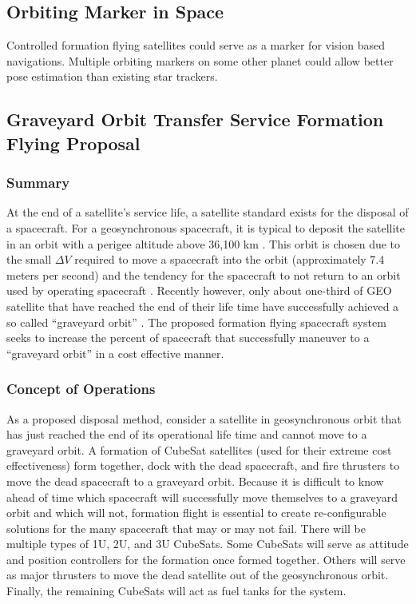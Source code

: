 \subsection{Orbiting Marker in Space}
\label{marker}
Controlled formation flying satellites could serve as a marker for vision based navigations. Multiple orbiting markers on some other planet could allow better pose estimation than existing star trackers.

\subsection{Graveyard Orbit Transfer Service Formation Flying Proposal}
\label{grave}
\subsubsection{Summary}
At the end of a satellite's service life, a satellite standard exists for the disposal of a spacecraft. For a geosynchronous spacecraft, it is typical to deposit the satellite in an orbit with a perigee altitude above 36,100 km \cite{standard}. This orbit is chosen due to the small $\Delta V$ required to move a spacecraft into the orbit (approximately 7.4 meters per second) and the tendency for the spacecraft to not return to an orbit used by operating spacecraft \cite {SMAD}. Recently however, only about one-third of GEO satellite that have reached the end of their life time have successfully achieved a so called ``graveyard orbit'' \cite{ESA}. The proposed formation flying spacecraft system seeks to increase the percent of spacecraft that successfully maneuver to a ``graveyard orbit'' in a cost effective manner. 

\subsubsection{Concept of Operations}
As a proposed disposal method, consider a satellite in geosynchronous orbit that has just reached the end of its operational life time and cannot move to a graveyard orbit. A formation of CubeSat satellites (used for their extreme cost effectiveness) form together, dock with the dead spacecraft, and fire thrusters to move the dead spacecraft to a graveyard orbit. Because it is difficult to know ahead of time which spacecraft will successfully move themselves to a graveyard orbit and which will not, formation flight is essential to create re-configurable solutions for the many spacecraft that may or may not fail. There will be multiple types of 1U, 2U, and 3U CubeSats. Some CubeSats will serve as attitude and position controllers for the formation once formed together. Others will serve as major thrusters to move the dead satellite out of the geosynchronous orbit. Finally, the remaining CubeSats will act as fuel tanks for the system.

